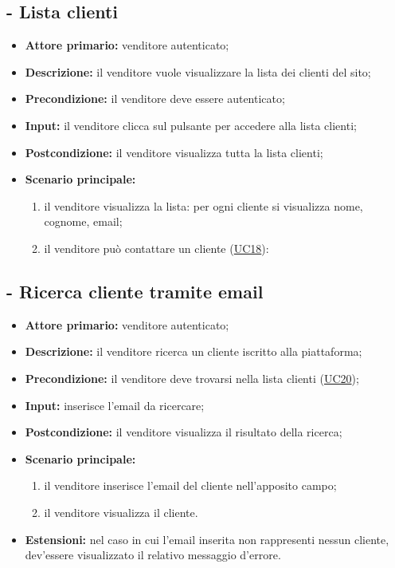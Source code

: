 \stepUserCase
\subsection{ - Lista clienti}
\begin{itemize}
    \item \textbf{Attore primario:} venditore autenticato;
    \item \textbf{Descrizione:} il venditore vuole visualizzare la lista dei clienti del sito;
    \item \textbf{Precondizione:} il venditore deve essere autenticato;
    \item \textbf{Input:} il venditore clicca sul pulsante per accedere alla lista clienti;
    \item \textbf{Postcondizione:} il venditore visualizza tutta la lista clienti;
    \item \textbf{Scenario principale:}
          \begin{enumerate}
              \item il venditore visualizza la lista: per ogni cliente si visualizza nome, cognome, email;
              \item il venditore può contattare un cliente (\hyperref[UC18]{UC18}):
          \end{enumerate}
\end{itemize}

\stepUserCase
\subsection{- Ricerca cliente tramite email}
\begin{itemize}
    \item \textbf{Attore primario:} venditore autenticato;
    \item \textbf{Descrizione:} il venditore ricerca un cliente iscritto alla piattaforma;
    \item \textbf{Precondizione:} il venditore deve trovarsi nella lista clienti (\hyperref[UC20]{UC20});
    \item \textbf{Input:} inserisce l'email da ricercare;
    \item \textbf{Postcondizione:} il venditore visualizza il risultato della ricerca;
    \item \textbf{Scenario principale:}
          \begin{enumerate}
              \item il venditore inserisce l'email del cliente nell'apposito campo;
              \item il venditore visualizza il cliente.
          \end{enumerate}
    \item \textbf{Estensioni:} nel caso in cui l'email inserita non rappresenti nessun cliente, dev'essere visualizzato il relativo messaggio d'errore.
\end{itemize}

